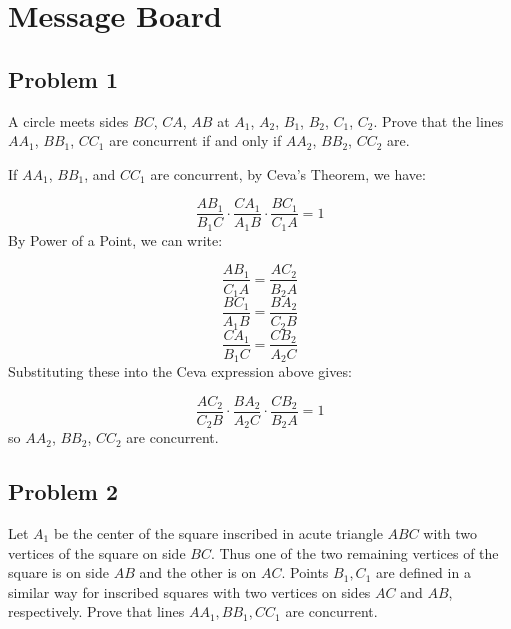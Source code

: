 \section{Message Board}

\subsection{Problem 1}

A circle meets sides $BC$, $CA$, $AB$ at $A_1$, $A_2$, $B_1$, $B_2$, $C_1$, $C_2$. Prove that the lines $AA_1$, $BB_1$, $CC_1$ are concurrent if and only if $AA_2$, $BB_2$, $CC_2$ are.

\begin{mdsoln}
If $AA_1$, $BB_1$, and $CC_1$ are concurrent, by Ceva's Theorem, we have:

\[\frac{AB_1}{B_1C}\cdot\frac{CA_1}{A_1B}\cdot\frac{BC_1}{C_1A} = 1\]
By Power of a Point, we can write:

\[\frac{AB_1}{C_1A} = \frac{AC_2}{B_2A}\]\[\frac{BC_1}{A_1B} = \frac{BA_2}{C_2B}\]\[\frac{CA_1}{B_1C} = \frac{CB_2}{A_2C}\]
Substituting these into the Ceva expression above gives:

\[\frac{AC_2}{C_2B}\cdot\frac{BA_2}{A_2C}\cdot\frac{CB_2}{B_2A} = 1\]
so $AA_2$, $BB_2$, $CC_2$ are concurrent.
\end{mdsoln}


\subsection{Problem 2}

Let $A_1$ be the center of the square inscribed in acute triangle $ABC$ with two vertices of the square on side $BC$. Thus one of the two remaining vertices of the square is on side $AB$ and the other is on $AC$. Points $B_1, C_1$ are defined in a similar way for inscribed squares with two vertices on sides $AC$ and $AB$, respectively. Prove that lines $AA_1, BB_1, CC_1$ are concurrent.

